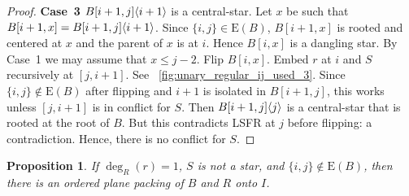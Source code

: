 \documentclass[11pt,a4paper,colorlinks=true,urlcolor=blue,citecolor=red]{article}
\theoremstyle{plain}
\newtheorem{proposition}[theorem]{Proposition}
\newcommand{\case}[1]{\par\vspace{.5\baselineskip}\noindent\textbf{\sffamily Case~#1}}
\newcommand{\EB}{\mathrm{E}(B)}
\begin{document}
\begin{proof}
  \case{3} $B{[i+1,j]}\langle{i+1}\rangle$ is a central-star. Let $x$ be such
  that $B[i+1,x]=B{[i+1,j]}\langle{i+1}\rangle$. Since $\{i,j\}\in\EB$,
  $B[i+1,x]$ is rooted and centered at $x$ and the parent of $x$ is at
  $i$. Hence $B[i,x]$ is a dangling star. By Case~1 we may assume that
  $x\leq j-2$. Flip $B[i,x]$. Embed $r$ at $i$ and $S$ recursively at
  $[j,i+1]$. See \figurename~\ref{fig:unary_regular_ij_used_3}. Since
  $\{i,j\}\not\in\EB$ after flipping and $i+1$ is isolated in
  $B[i+1,j]$, this works unless $[j,i+1]$ is in conflict for $S$. Then
  $B{[i+1,j]}\langle{j}\rangle$ is a central-star that is rooted at the root of
  $B$. But this contradicts LSFR at $j$ before flipping: a
  contradiction. Hence, there is no conflict for $S$.
\end{proof}

\begin{proposition}\label{prop:rec_unary_regular_ij_not_used}
  If $\deg_R(r)=1$, $S$ is not a star, and
  $\{i,j\}\not\in\EB$, then there is an ordered plane packing
  of $B$ and $R$ onto $I$.
\end{proposition}
\end{document}
